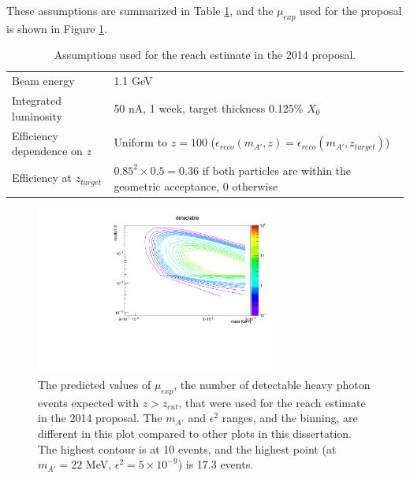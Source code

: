 These assumptions are summarized in Table \ref{tab:proposal_assumptions}, and the $\mu_{exp}$ used for the proposal is shown in Figure \ref{fig:proposal_detectable}.

\begin{table}[ht]
    \begin{center}
        \caption{Assumptions used for the reach estimate in the 2014 proposal.}
        \begin{tabular}{lp{}}
            \hline \hline
            Beam energy & 1.1 GeV \\
            Integrated luminosity & 50 nA, 1 week, target thickness 0.125\% $X_0$ \\
            Efficiency dependence on $z$ & Uniform to $z=100$ ($\epsilon_{reco}(m_{A'},z) = \epsilon_{reco}(m_{A'},z_{target})$) \\
            Efficiency at $z_{target}$ & $0.85^2\times 0.5=0.36$ if both particles are within the geometric acceptance, 0 otherwise \\
            \hline \hline
        \end{tabular}
        \label{tab:proposal_assumptions} 
    \end{center}
\end{table}

\begin{figure}[ht]
\begin{center}
    \includegraphics[width=0.7\textwidth,page=1,angle=-90]{vertexing/figs/mgraham_signal}
\end{center}
    \caption{The predicted values of $\mu_{exp}$, the number of detectable heavy photon events expected with $z>z_{cut}$, that were used for the reach estimate in the 2014 proposal.
    The $m_{A'}$ and $\epsilon^2$ ranges, and the binning, are different in this plot compared to other plots in this dissertation.
    The highest contour is at 10 events, and the highest point (at $m_{A'}=22$ MeV, $\epsilon^2=5\times 10^{-9}$) is 17.3 events.
    }
    \label{fig:proposal_detectable}
\end{figure}

